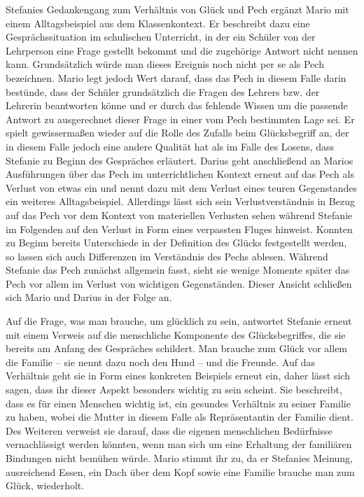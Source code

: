 Stefanies Gedankengang zum Verhältnis von Glück und Pech ergänzt Mario mit einem Alltagsbeispiel aus dem Klassenkontext. 
Er beschreibt dazu eine Gesprächssituation im schulischen Unterricht, in der ein Schüler von der Lehrperson eine Frage gestellt bekommt und die zugehörige Antwort nicht nennen kann. 
Grundsätzlich würde man dieses Ereignis noch nicht per se als Pech bezeichnen. 
Mario legt jedoch Wert darauf, dass das Pech in diesem Falle darin bestünde, dass der Schüler grundsätzlich die Fragen des Lehrers bzw. der Lehrerin beantworten könne und er durch das fehlende Wissen um die passende Antwort zu ausgerechnet dieser Frage in einer vom Pech bestimmten Lage sei.  
Er spielt gewissermaßen wieder auf die Rolle des Zufalls beim Glücksbegriff an, der in diesem Falle jedoch eine andere Qualität hat als im Falle des Losens, dass Stefanie zu Beginn des Gespräches erläutert. 
Darius geht anschließend an Marios Ausführungen über das Pech im unterrichtlichen Kontext erneut auf das Pech als Verlust von etwas ein und nennt dazu mit dem Verlust eines teuren Gegenstandes ein weiteres Alltagsbeispiel.
Allerdings lässt sich sein Verlustverständnis in Bezug auf das Pech vor dem Kontext von materiellen Verlusten sehen während Stefanie im Folgenden auf den Verlust in Form eines verpassten Fluges hinweist. 
Konnten zu Beginn bereits Unterschiede in der Definition des Glücks festgestellt werden, so lassen sich auch Differenzen im Verständnis des Pechs ablesen. 
Während Stefanie das Pech zunächst allgemein fasst, sieht sie wenige Momente später das Pech vor allem im Verlust von wichtigen Gegenständen. 
Dieser Ansicht schließen sich Mario und Darius in der Folge an.

Auf die Frage, was man brauche, um glücklich zu sein, antwortet Stefanie erneut mit einem Verweis auf die menschliche Komponente des Glücksbegriffes, die sie bereits am Anfang des Gespräches schildert. 
Man brauche zum Glück vor allem die Familie -- sie nennt dazu noch den Hund -- und die Freunde. 
Auf das Verhältnis geht sie in Form eines konkreten Beispiels erneut ein, daher lässt sich sagen, dass ihr dieser Aspekt besonders wichtig zu sein scheint. 
Sie beschreibt, dass es für einen Menschen wichtig ist, ein gesundes Verhältnis zu seiner Familie zu haben, wobei die Mutter in diesem Falle als Repräsentantin der Familie dient. 
Des Weiteren verweist sie darauf, dass die eigenen menschlichen Bedürfnisse vernachlässigt werden könnten, wenn man sich um eine Erhaltung der familiären Bindungen nicht bemühen würde.
Mario stimmt ihr zu, da er Stefanies Meinung, ausreichend Essen, ein Dach über dem Kopf sowie eine Familie brauche man zum Glück, wiederholt. 

